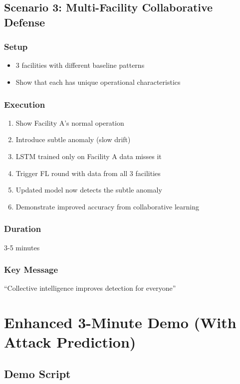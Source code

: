 \documentclass[11pt,a4paper]{article}
\begin{document}
\subsection{Scenario 3: Multi-Facility Collaborative Defense}

\subsubsection{Setup}
\begin{itemize}[leftmargin=*]
    \item 3 facilities with different baseline patterns
    \item Show that each has unique operational characteristics
\end{itemize}

\subsubsection{Execution}

\begin{enumerate}[leftmargin=*]
    \item Show Facility A's normal operation
    \item Introduce subtle anomaly (slow drift)
    \item LSTM trained only on Facility A data misses it
    \item Trigger FL round with data from all 3 facilities
    \item Updated model now detects the subtle anomaly
    \item Demonstrate improved accuracy from collaborative learning
\end{enumerate}

\subsubsection{Duration}
3-5 minutes

\subsubsection{Key Message}
``Collective intelligence improves detection for everyone''

\section{Enhanced 3-Minute Demo (With Attack Prediction)}

\subsection{Demo Script}
\end{document}
